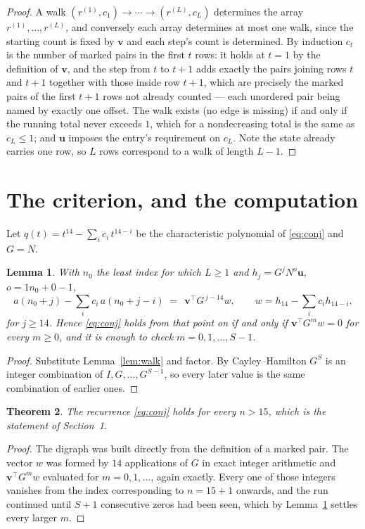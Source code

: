 \documentclass[11pt,a4paper]{article}
\theoremstyle{plain}
\newtheorem{theorem}{Theorem}
\newtheorem{lemma}[theorem]{Lemma}
\theoremstyle{definition}
\begin{document}
\begin{proof}
A walk $(r^{(1)},c_1)\to\cdots\to(r^{(L)},c_L)$ determines the array
$r^{(1)},\dots,r^{(L)}$, and conversely each array determines at most one walk, since the
starting count is fixed by $\mathbf{v}$ and each step's count is determined. By induction
$c_t$ is the number of marked pairs in the first $t$ rows: it holds at $t=1$ by the
definition of $\mathbf{v}$, and the step from $t$ to $t+1$ adds exactly the pairs joining
rows $t$ and $t+1$ together with those inside row $t+1$, which are precisely the marked
pairs of the first $t+1$ rows not already counted --- each unordered pair being named by
exactly one offset. The walk exists (no edge is missing) if and only if the running total
never exceeds $1$, which for a nondecreasing total is the same as $c_L\le1$; and
$\mathbf{u}$ imposes the entry's requirement on $c_L$. Note the state already carries one
row, so $L$ rows correspond to a walk of length $L-1$.
\end{proof}

\section{The criterion, and the computation}

Let $q(t)=t^{14}-\sum_i c_i\,t^{14-i}$ be the characteristic polynomial of
\eqref{eq:conj} and $G=N$.

\begin{lemma}\label{lem:crit}
With $n_0$ the least index for which $L\ge1$ and $h_j=G^{j}N^{o}\mathbf{u}$,
$o=1n_0+0-1$,
\[
a(n_0+j)-\sum_i c_i\,a(n_0+j-i)\;=\;\,\mathbf{v}^{\!\top}G^{\,j-14}w,
\qquad w=h_{14}-\sum_i c_i h_{14-i},
\]
for $j\ge14$. Hence \eqref{eq:conj} holds from that point on if and only if
$\mathbf{v}^{\!\top}G^{m}w=0$ for every $m\ge0$, and it is enough to check
$m=0,1,\dots,S-1$.
\end{lemma}

\begin{proof}
Substitute Lemma~\ref{lem:walk} and factor. By Cayley--Hamilton $G^{S}$ is an integer
combination of $I,G,\dots,G^{S-1}$, so every later value is the same combination of earlier
ones.
\end{proof}

\begin{theorem}
The recurrence \eqref{eq:conj} holds for every $n>15$, which is the statement of
Section~1.
\end{theorem}

\begin{proof}
The digraph was built directly from the definition of a marked pair. The vector $w$ was
formed by $14$ applications of $G$ in exact integer arithmetic and
$\mathbf{v}^{\!\top}G^{m}w$ evaluated for $m=0,1,\dots$, again exactly. Every one of
those integers vanishes from the index corresponding to $n=15+1$ onwards, and the run
continued until $S+1$ consecutive zeros had been seen, which by Lemma~\ref{lem:crit}
settles every larger $m$.
\end{proof}
\end{document}
